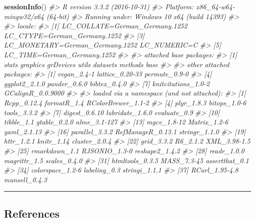 \documentclass[]{article}
\newenvironment{Shaded}{}{}
\newcommand{\KeywordTok}[1]{\textbf{{#1}}}
\newcommand{\CommentTok}[1]{\textcolor[rgb]{0.50,0.50,0.50}{\textit{{#1}}}}
\newcommand{\NormalTok}[1]{{#1}}
\begin{document}
\begin{Shaded}
\begin{Highlighting}[]
\KeywordTok{sessionInfo}\NormalTok{()}
\CommentTok{#> R version 3.3.2 (2016-10-31)}
\CommentTok{#> Platform: x86_64-w64-mingw32/x64 (64-bit)}
\CommentTok{#> Running under: Windows 10 x64 (build 14393)}
\CommentTok{#> }
\CommentTok{#> locale:}
\CommentTok{#> [1] LC_COLLATE=German_Germany.1252  LC_CTYPE=German_Germany.1252   }
\CommentTok{#> [3] LC_MONETARY=German_Germany.1252 LC_NUMERIC=C                   }
\CommentTok{#> [5] LC_TIME=German_Germany.1252    }
\CommentTok{#> }
\CommentTok{#> attached base packages:}
\CommentTok{#> [1] stats     graphics  grDevices utils     datasets  methods   base     }
\CommentTok{#> }
\CommentTok{#> other attached packages:}
\CommentTok{#> [1] vegan_2.4-1         lattice_0.20-33     permute_0.9-0      }
\CommentTok{#> [4] ggplot2_2.1.0       pander_0.6.0        bibtex_0.4.0       }
\CommentTok{#> [7] knitcitations_1.0-2 GCalignR_0.0.9000  }
\CommentTok{#> }
\CommentTok{#> loaded via a namespace (and not attached):}
\CommentTok{#>  [1] Rcpp_0.12.4        formatR_1.4        RColorBrewer_1.1-2}
\CommentTok{#>  [4] plyr_1.8.3         bitops_1.0-6       tools_3.3.2       }
\CommentTok{#>  [7] digest_0.6.10      lubridate_1.6.0    evaluate_0.9      }
\CommentTok{#> [10] tibble_1.1         gtable_0.2.0       nlme_3.1-127      }
\CommentTok{#> [13] mgcv_1.8-12        Matrix_1.2-6       yaml_2.1.13       }
\CommentTok{#> [16] parallel_3.3.2     RefManageR_0.13.1  stringr_1.1.0     }
\CommentTok{#> [19] httr_1.2.1         knitr_1.14         cluster_2.0.4     }
\CommentTok{#> [22] grid_3.3.2         R6_2.1.2           XML_3.98-1.5      }
\CommentTok{#> [25] rmarkdown_1.1      RJSONIO_1.3-0      reshape2_1.4.2    }
\CommentTok{#> [28] readr_1.0.0        magrittr_1.5       scales_0.4.0      }
\CommentTok{#> [31] htmltools_0.3.5    MASS_7.3-45        assertthat_0.1    }
\CommentTok{#> [34] colorspace_1.2-6   labeling_0.3       stringi_1.1.1     }
\CommentTok{#> [37] RCurl_1.95-4.8     munsell_0.4.3}
\end{Highlighting}
\end{Shaded}

\begin{center}\rule{0.5\linewidth}{\linethickness}\end{center}

\subsection*{References}\label{references}
\end{document}
